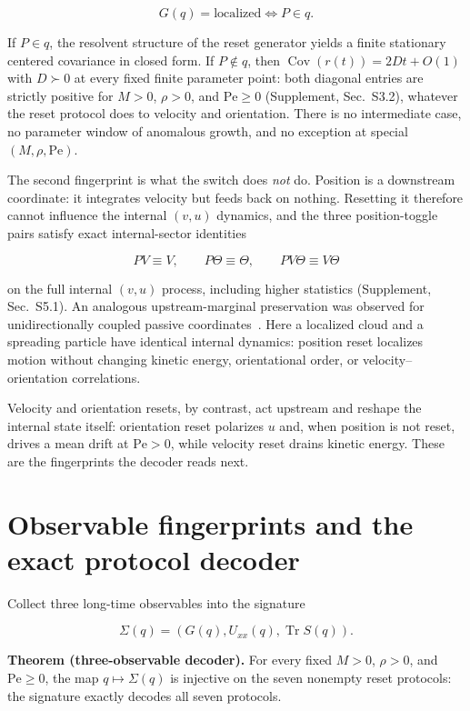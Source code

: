 \[
G(q)=\text{localized}\iff P\in q .
\]

If $P\in q$, the resolvent structure of the reset generator yields a finite stationary centered covariance in closed form. If $P\notin q$, then $\operatorname{Cov}(r(t))=2Dt+O(1)$ with $D\succ0$ at every fixed finite parameter point: both diagonal entries are strictly positive for $M>0$, $\rho>0$, and $\mathrm{Pe}\ge0$ (Supplement, Sec.~S3.2), whatever the reset protocol does to velocity and orientation. There is no intermediate case, no parameter window of anomalous growth, and no exception at special $(M,\rho,\mathrm{Pe})$.

The second fingerprint is what the switch does \emph{not} do. Position is a downstream coordinate: it integrates velocity but feeds back on nothing. Resetting it therefore cannot influence the internal $(v,u)$ dynamics, and the three position-toggle pairs satisfy exact internal-sector identities

\[
PV\equiv V,\qquad P\Theta\equiv\Theta,\qquad PV\Theta\equiv V\Theta
\]

on the full internal $(v,u)$ process, including higher statistics (Supplement, Sec.~S5.1). An analogous upstream-marginal preservation was observed for unidirectionally coupled passive coordinates~\cite{ChakiOlsenLowen}. Here a localized cloud and a spreading particle have identical internal dynamics: position reset localizes motion without changing kinetic energy, orientational order, or velocity--orientation correlations.

Velocity and orientation resets, by contrast, act upstream and reshape the internal state itself: orientation reset polarizes $u$ and, when position is not reset, drives a mean drift at $\mathrm{Pe}>0$, while velocity reset drains kinetic energy. These are the fingerprints the decoder reads next.

\section{Observable fingerprints and the exact protocol decoder}\label{decoder}

Collect three long-time observables into the signature

\[
\Sigma(q)=(G(q),U_{xx}(q),\operatorname{Tr}S(q)).
\]

\textbf{Theorem (three-observable decoder).} For every fixed $M>0$, $\rho>0$, and $\mathrm{Pe}\ge0$, the map $q\mapsto\Sigma(q)$ is injective on the seven nonempty reset protocols: the signature exactly decodes all seven protocols.

